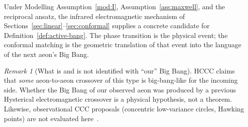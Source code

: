 \documentclass[11pt]{article}
\theoremstyle{definition}
\theoremstyle{remark}
\newtheorem{remark}[theorem]{Remark}
\begin{document}
Under Modelling Assumption~\ref{mod:I}, Assumption~\ref{ass:maxwell}, and the reciprocal ansatz,
the infrared electromagnetic mechanism of Sections~\ref{sec:linear}--\ref{sec:conformal}
supplies a concrete candidate for Definition~\ref{def:active-bang}.
The phase transition is the physical event; the conformal matching is the geometric
translation of that event into the language of the next aeon's Big Bang.

\begin{remark}[What is and is not identified with ``our'' Big Bang]
\label{rem:ourBB}
HCCC claims that \emph{some} aeon-to-aeon crossover of this type is big-bang-like for the
incoming side.
Whether the Big Bang of our observed aeon was produced by a previous Hysterical electromagnetic
crossover is a physical hypothesis, not a theorem.
Likewise, observational CCC proposals (concentric low-variance circles, Hawking points) are not
evaluated here~\cite{Penrose2010,Penrose2013CCC}.
\end{remark}
\end{document}
